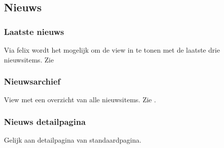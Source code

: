 \subsection{Nieuws}\label{nieuws}

\subsubsection{Laatste nieuws}

Via felix wordt het mogelijk om de view in te tonen met de laatste drie nieuwsitems. Zie 

\subsubsection{Nieuwsarchief}

View met een overzicht van alle nieuwsitems. Zie .

\subsubsection{Nieuws detailpagina}

Gelijk aan detailpagina van standaardpagina.